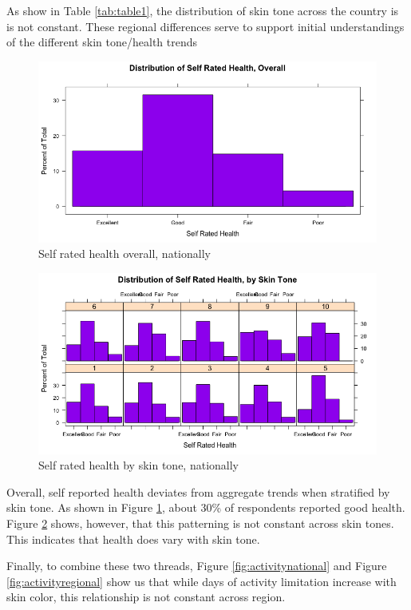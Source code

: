 \documentclass{article}
\begin{document}
As show in Table \ref{tab:table1}, the distribution of skin tone across the country is is not constant. These regional differences serve to support initial understandings of the different skin tone/health trends
\begin{figure}[h!]
\centering
\includegraphics[scale=.3]{SelfRatedHealthOverall.png}
\caption{Self rated health overall, nationally}
\label{fig:SRHOverall}
\end{figure}
\begin{figure}[h!]
\centering
\includegraphics[scale=.3]{SelfRateHealthTone.png}
\caption{Self rated health by skin tone, nationally}
\label{fig:SRHTone}
\end{figure}
Overall, self reported health deviates from aggregate trends when stratified by skin tone. As shown in Figure \ref{fig:SRHOverall}, about 30\% of respondents reported good health. Figure \ref{fig:SRHTone} shows, however, that this patterning is not constant across skin tones. This indicates that health does vary with skin tone. 

Finally, to combine these two threads, Figure \ref{fig:activitynational} and Figure \ref{fig:activityregional} show us that while days of activity limitation increase with skin color, this relationship is not constant across region. 
\end{document}
